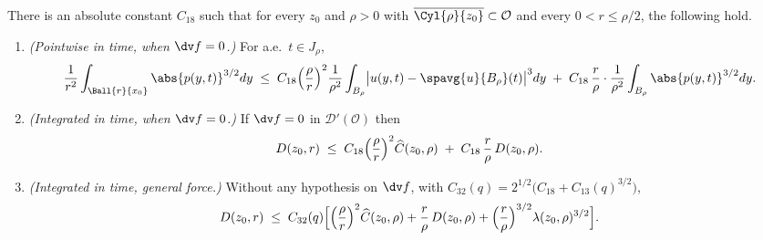 \documentclass[11pt,reqno]{amsart}
\begin{document}
\begin{proposition}
\label{prop:lin34}
There is an absolute constant $C_{18}$ such that for every
$z_{0}$ and $\rho>0$ with $\overline{\Cyl{\rho}{z_{0}}}\subset\mathcal{O}$ and every
$0<r\le\rho/2$, the following hold.
\begin{enumerate}
\item[(i)] \emph{(Pointwise in time, when $\dv f=0$.)} For a.e.\ $t\in J_{\rho}$,
\begin{equation}\label{eq:lin34-pointwise}
  \frac1{r^{2}}\int_{\Ball{r}{x_{0}}}\abs{p(y,t)}^{3/2}dy
  \;\le\;C_{18}\Bigl(\frac\rho r\Bigr)^{2}\frac1{\rho^{2}}
     \int_{B_{\rho}}\bigl|u(y,t)-\spavg{u}{B_{\rho}}(t)\bigr|^{3}dy
   \;+\;C_{18}\,\frac r\rho\cdot\frac1{\rho^{2}}
     \int_{B_{\rho}}\abs{p(y,t)}^{3/2}dy .
\end{equation}
\item[(ii-a)] \emph{(Integrated in time, when $\dv f=0$.)} If $\dv f=0$ in
$\mathcal{D}'(\mathcal{O})$ then
\begin{equation}\label{eq:lin35}
  D(z_{0},r)\;\le\;C_{18}\Bigl(\frac\rho r\Bigr)^{2}\widehat C(z_{0},\rho)
   \;+\;C_{18}\,\frac r\rho\,D(z_{0},\rho).
\end{equation}
\item[(ii-b)] \emph{(Integrated in time, general force.)} Without any hypothesis
on $\dv f$, with $C_{32}(q)=2^{1/2}\bigl(C_{18}+C_{13}(q)^{3/2}\bigr)$,
\begin{equation}\label{eq:lin35-force}
  D(z_{0},r)\;\le\;C_{32}(q)\Bigl[\Bigl(\frac\rho r\Bigr)^{2}\widehat C(z_{0},\rho)
   +\frac r\rho\,D(z_{0},\rho)
   +\Bigl(\frac r\rho\Bigr)^{3/2}\lambda(z_{0},\rho)^{3/2}\Bigr].
\end{equation}
\end{enumerate}
\end{proposition}
\end{document}
